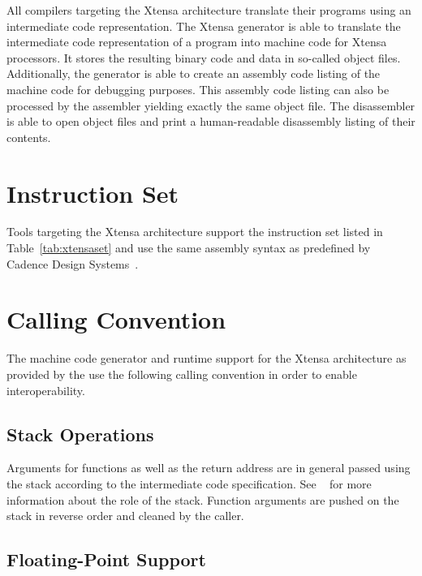 All compilers targeting the Xtensa architecture translate their programs using an intermediate code representation.
The Xtensa generator is able to translate the intermediate code representation of a program into machine code for Xtensa processors.
It stores the resulting binary code and data in so-called object files.
Additionally, the generator is able to create an assembly code listing of the machine code for debugging purposes.
This assembly code listing can also be processed by the assembler yielding exactly the same object file.
The disassembler is able to open object files and print a human-readable disassembly listing of their contents.
\seeobject\seecode

\section{Instruction Set}

Tools targeting the Xtensa architecture support the instruction set listed in Table~\ref{tab:xtensaset} and use the same assembly syntax as predefined by Cadence Design Systems~\cite{xtensa:instructionset}.
\seeassembly


\section{Calling Convention}

The machine code generator and runtime support for the Xtensa architecture as provided by the \ecs{} use the following calling convention in order to enable interoperability.

\subsection{Stack Operations}

Arguments for functions as well as the return address are in general passed using the stack according to the intermediate code specification.
See \Documentation{}~ for more information about the role of the stack.
Function arguments are pushed on the stack in reverse order and cleaned by the caller.

\subsection{Floating-Point Support}

